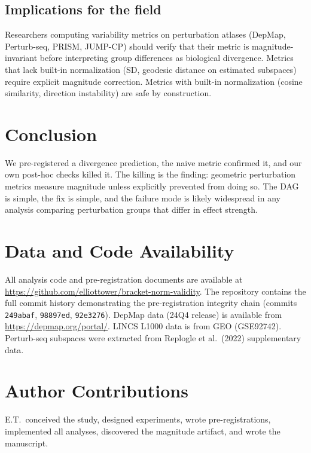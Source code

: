 \documentclass[11pt]{article}
\begin{document}
\subsection{Implications for the field}

Researchers computing variability metrics on perturbation atlases
(DepMap, Perturb-seq, PRISM, JUMP-CP) should verify that their metric is
magnitude-invariant before interpreting group differences as biological
divergence. Metrics that lack built-in normalization (SD, geodesic
distance on estimated subspaces) require explicit magnitude correction.
Metrics with built-in normalization (cosine similarity, direction
instability) are safe by construction.

\section{Conclusion}

We pre-registered a divergence prediction, the naive metric confirmed
it, and our own post-hoc checks killed it. The killing is the finding:
geometric perturbation metrics measure magnitude unless explicitly
prevented from doing so. The DAG is simple, the fix is simple, and the
failure mode is likely widespread in any analysis comparing perturbation
groups that differ in effect strength.

\section*{Data and Code Availability}

All analysis code and pre-registration documents are available at
\url{https://github.com/elliottower/bracket-norm-validity}. The
repository contains the full commit history demonstrating the
pre-registration integrity chain (commits \texttt{249abaf},
\texttt{98897ed}, \texttt{92e3276}). DepMap data (24Q4 release) is
available from \url{https://depmap.org/portal/}. LINCS L1000 data is
from GEO (GSE92742). Perturb-seq subspaces were extracted from Replogle
et al.\ (2022) supplementary data.

\section*{Author Contributions}

E.T.\ conceived the study, designed experiments, wrote pre-registrations,
implemented all analyses, discovered the magnitude artifact, and wrote
the manuscript.



\end{document}
